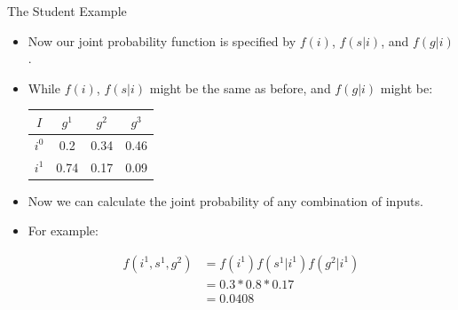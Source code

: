 \documentclass[handout]{beamer}
\begin{document}
\begin{frame}{The Student Example}
\scriptsize{
\begin{itemize}

\item Now our joint probability function  is specified by $f(i)$, $f(s|i)$, and $f(g|i)$.

\item While  $f(i)$, $f(s|i)$ might be the same as before, and  $f(g|i)$ might be:


\begin{table}
\centering
  \begin{tabular}{c||ccc} \hline
$I$ & $g^1$ & $g^2$ & $g^3$  \\ \hline
$i^0$ & 0.2 & 0.34 & 0.46 \\
$i^1$ & 0.74 & 0.17 & 0.09 \\

\end{tabular} 
\end{table}

\item Now we can calculate the joint probability of any combination of inputs.

\item For example: 

 \begin{align}
  f(i^1,s^1,g^2) & = f(i^1)f(s^1|i^1)f(g^2|i^1) \\
   & = 0.3*0.8*0.17 \\
   & = 0.0408
 \end{align}

\end{itemize}



} 

\end{frame}
\end{document}
